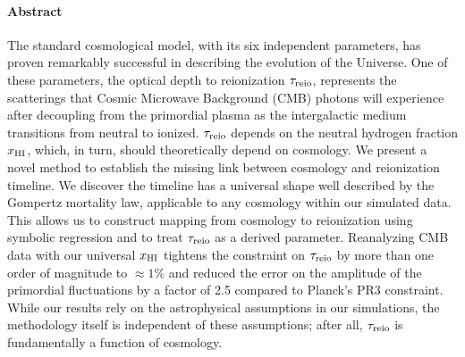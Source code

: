 

\paragraph{\large Abstract}

The standard cosmological model, with its six independent parameters,
has proven remarkably successful in describing the evolution of the
Universe.
One of these parameters, the optical depth to reionization $\tau_{\mathrm{reio}}$,
represents the scatterings that Cosmic Microwave Background (CMB)
photons will experience after decoupling from the primordial plasma as
the intergalactic medium transitions from neutral to ionized.
$\tau_{\mathrm{reio}}$ depends on the neutral hydrogen fraction $x_{\mathrm{HI}}$, which, in
turn, should theoretically depend on cosmology.
We present a novel method to establish the missing link between
cosmology and reionization timeline.
We discover the timeline has a universal shape well described by the
Gompertz mortality law, applicable to any cosmology within our simulated
data.
This allows us to construct mapping from cosmology to reionization using
symbolic regression and to treat $\tau_{\mathrm{reio}}$ as a derived parameter.
Reanalyzing CMB data with our universal $x_{\mathrm{HI}}$ tightens the constraint
on $\tau_{\mathrm{reio}}$ by more than one order of magnitude to $\approx 1\%$ and
reduced the error on the amplitude of the primordial fluctuations by a
factor of 2.5 compared to Planck's PR3 constraint.
While our results rely on the astrophysical assumptions in our
simulations, the methodology itself is independent of these assumptions;
after all, $\tau_{\mathrm{reio}}$ is fundamentally a function of cosmology.
